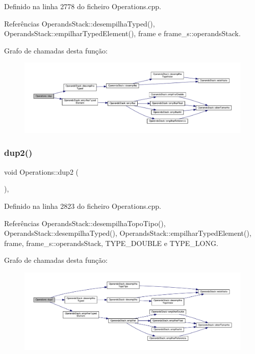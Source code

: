 Definido na linha 2778 do ficheiro Operations.\+cpp.



Referências Operands\+Stack\+::desempilha\+Typed(), Operands\+Stack\+::empilhar\+Typed\+Element(), frame e frame\+\_\+s\+::operands\+Stack.

Grafo de chamadas desta função\+:\nopagebreak
\begin{figure}[H]
\begin{center}
\leavevmode
\includegraphics[width=350pt]{classOperations_a0cba4ff895f2e3908eea5b39305481a4_cgraph}
\end{center}
\end{figure}
\mbox{\label{classOperations_a7cb6985281b1ab32e905e4726ef2c964}} 
\subsubsection{\texorpdfstring{dup2()}{dup2()}}
{\footnotesize\ttfamily void Operations\+::dup2 (\begin{DoxyParamCaption}{ }\end{DoxyParamCaption})\hspace{0.3cm}{\ttfamily [static]}, {\ttfamily [private]}}



Definido na linha 2823 do ficheiro Operations.\+cpp.



Referências Operands\+Stack\+::desempilha\+Topo\+Tipo(), Operands\+Stack\+::desempilha\+Typed(), Operands\+Stack\+::empilhar\+Typed\+Element(), frame, frame\+\_\+s\+::operands\+Stack, T\+Y\+P\+E\+\_\+\+D\+O\+U\+B\+LE e T\+Y\+P\+E\+\_\+\+L\+O\+NG.

Grafo de chamadas desta função\+:\nopagebreak
\begin{figure}[H]
\begin{center}
\leavevmode
\includegraphics[width=350pt]{classOperations_a7cb6985281b1ab32e905e4726ef2c964_cgraph}
\end{center}
\end{figure}
\mbox{\label{classOperations_a57b0cf4d7a133bf35b39fcf8d6e15511}} 
